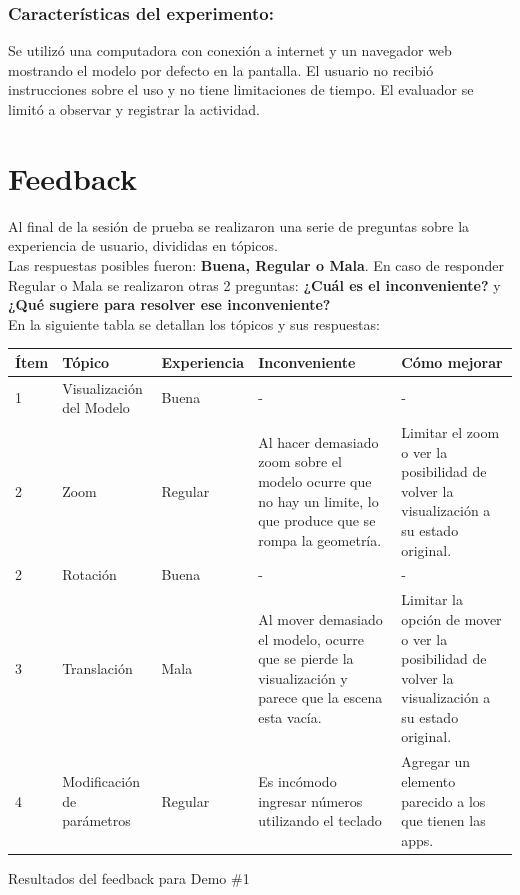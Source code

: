 \subsubsection{Características del experimento:} 
Se utilizó una computadora con conexión a internet y un navegador web mostrando el modelo por defecto en la pantalla. El usuario no recibió instrucciones sobre el uso y no tiene limitaciones de tiempo. El evaluador se limitó a observar y registrar la actividad.

\section{Feedback}
\label{feedback}

Al final de la sesión de prueba se realizaron una serie de preguntas sobre la experiencia de usuario, divididas en tópicos. \\ 
Las respuestas posibles fueron: \textbf{Buena, Regular o Mala}. En caso de responder Regular o Mala se realizaron otras 2 preguntas: \textbf{¿Cuál es el inconveniente?} y \textbf{¿Qué sugiere para resolver ese inconveniente?}\\ 
En la siguiente tabla se detallan los tópicos y sus respuestas:

\begin{longtable}{ |p{0.8cm}|p{2.3cm}|p{2.2cm}|p{3.6cm}|p{3.6cm}| }
\hline
     Ítem & Tópico & Experiencia  & Inconveniente & Cómo mejorar\\
\hline
1 & Visualización del Modelo & Buena & - & -\\
\hline
2 & Zoom & Regular & Al hacer demasiado zoom sobre el modelo ocurre que no hay un limite, lo que produce que se rompa la geometría. & Limitar el zoom o ver la posibilidad de volver la visualización a su estado original.
\\
\hline
2 & Rotación & Buena & - & -\\
\hline
3 & Translación & Mala & Al mover demasiado el modelo, ocurre que se pierde la visualización y parece que la escena esta vacía. & Limitar la opción de mover o ver la posibilidad de volver la visualización a su estado original.
\\
\hline
4 & Modificación de parámetros & Regular & Es incómodo ingresar números utilizando el teclado & Agregar un elemento parecido a los que tienen las apps.\\
\hline
\end{longtable}
\begin{center}
    \caption{\footnotesize{Resultados del feedback para Demo \#1}}
\end{center}

